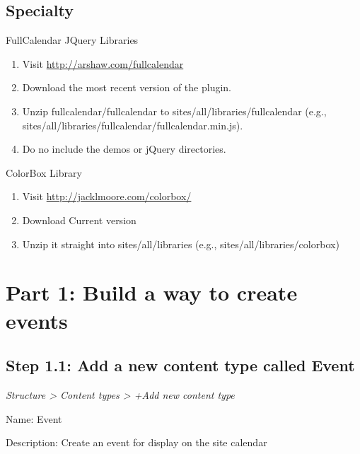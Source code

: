 \documentclass[letterpaper,10pt,english]{sphinxmanual}
\begin{document}
\section{Specialty}
\label{event_calendar:specialty}
FullCalendar JQuery Libraries
\begin{enumerate}
\item {} 
Visit \href{http://arshaw.com/fullcalendar}{http://arshaw.com/fullcalendar}

\item {} 
Download the most recent version of the plugin.

\item {} 
Unzip fullcalendar/fullcalendar to sites/all/libraries/fullcalendar (e.g., sites/all/libraries/fullcalendar/fullcalendar.min.js).

\item {} 
Do no include the demos or jQuery directories.

\end{enumerate}

ColorBox Library
\begin{enumerate}
\item {} 
Visit \href{http://jacklmoore.com/colorbox/}{http://jacklmoore.com/colorbox/}

\item {} 
Download Current version

\item {} 
Unzip it straight into sites/all/libraries (e.g., sites/all/libraries/colorbox)

\end{enumerate}


\chapter{Part 1: Build a way to create events}
\label{event_calendar:part-1-build-a-way-to-create-events}

\section{Step 1.1: Add a new content type called Event}
\label{event_calendar:step-1-1-add-a-new-content-type-called-event}
\emph{Structure \textgreater{} Content types \textgreater{} +Add new content type}

Name: Event

Description: Create an event for display on the site calendar
\end{document}
